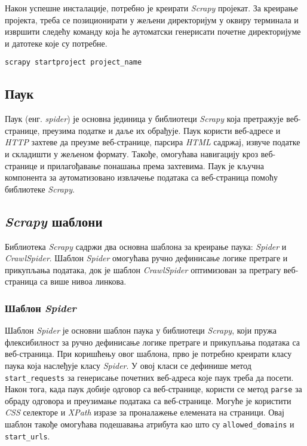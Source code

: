 \documentclass[12pt,oneside]{memoir}
\begin{document}
Након успешне инсталације, потребно је креирати \textit{Scrapy} пројекат.
За креирање пројекта, треба се позиционирати у жељени директоријум у оквиру терминала и извршити следећу команду која ће аутоматски генерисати почетне директоријуме и датотеке које су потребне.
\begin{verbatim}
scrapy startproject project_name
\end{verbatim}

\subsection{Паук}
Паук (енг. \textit{spider}) је основна јединица у библиотеци \textit{Scrapy} која претражује веб-странице, преузима податке и даље их обрађује. Паук користи веб-адресе и \textit{HTTP} захтеве да преузме веб-странице, парсира \textit{HTML} садржај, извуче податке и складишти у жељеном формату. Такође, омогућава навигацију кроз веб-странице и прилагођавање понашања према захтевима. Паук је кључна компонента за аутоматизовано извлачење података са веб-страница помоћу библиотеке \textit{Scrapy}.  

\subsection{\textit{Scrapy} шаблони}
Библиотека \textit{Scrapy} садржи два основна шаблона за креирање паука: \textit{Spider} и \textit{CrawlSpider}. Шаблон \textit{Spider} омогућава ручно дефинисање логике претраге и прикупљања података, док је шаблон \textit{CrawlSpider} оптимизован за претрагу веб-страница са више нивоа линкова.

\subsubsection{Шаблон \textit{Spider}}
Шаблон \textit{Spider} је основни шаблон паука у библиотеци \textit{Scrapy}, који пружа флексибилност за ручно дефинисање логике претраге и прикупљања података са веб-страница. При коришћењу овог шаблона, прво је потребно креирати класу паука која наслеђује класу \textit{Spider}. У овој класи се дефинише метод \texttt{start\_requests} за генерисање почетних веб-адреса које паук треба да посети. Након тога, када паук добије одговор са веб-странице, користи се метод \texttt{parse} за обраду одговора и преузимање података са веб-странице. Могуће је користити \textit{CSS} селекторе и \textit{XPath} изразе за проналажење елемената на страници. Овај шаблон такође омогућава подешавања атрибута као што су \texttt{allowed\_domains} и \texttt{start\_urls}.
\end{document}
